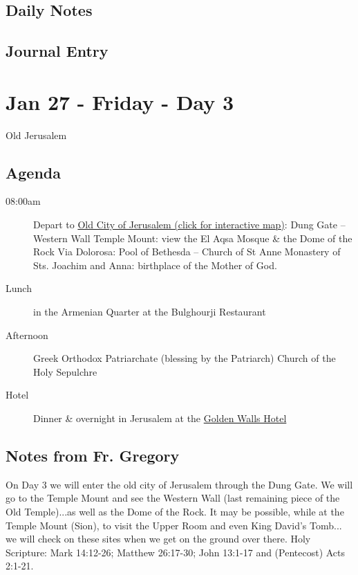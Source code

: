 \documentclass[letterpaper]{report}
\begin{document}
\clearpage
\subsection{Daily Notes}

\clearpage
\subsection{Journal Entry}

\clearpage
\section{Jan 27 - Friday - Day 3}
Old Jerusalem
\subsection{Agenda}
\begin{description}
	\item[08:00am] Depart to  \href{http://jerusalem.com/map#!/explore/view}{
			Old City of Jerusalem (click for interactive map)}:
		\subitem Dung Gate – Western Wall
		\subitem Temple Mount:
		    view the El Aqsa Mosque \& the Dome of the Rock 
		\subitem Via Dolorosa:
		    Pool of Bethesda -- Church of St Anne
		\subitem Monastery of Sts. Joachim and Anna:
		    birthplace of the Mother of God.
	\item[Lunch] in the Armenian Quarter at the Bulghourji Restaurant 
	\item[Afternoon] Greek Orthodox Patriarchate (blessing by the Patriarch) 
		\subitem Church of the Holy Sepulchre
	\item[Hotel] Dinner \& overnight in Jerusalem at the
	  \href{http://goldenwalls.com/}{Golden Walls Hotel}
\end{description}

\subsection{Notes from Fr. Gregory}
On Day 3 we will enter the old city of Jerusalem through the Dung Gate.
We will go to the Temple Mount and see the Western Wall
(last remaining piece of the Old Temple)...as well as the Dome of the Rock.
It may be possible, while at the Temple Mount (Sion),
to visit the Upper Room and even King David's Tomb...
we will check on these sites when we get on the ground over there.
Holy Scripture: Mark 14:12-26; Matthew 26:17-30;
John 13:1-17 and (Pentecost) Acts 2:1-21.
\end{document}
